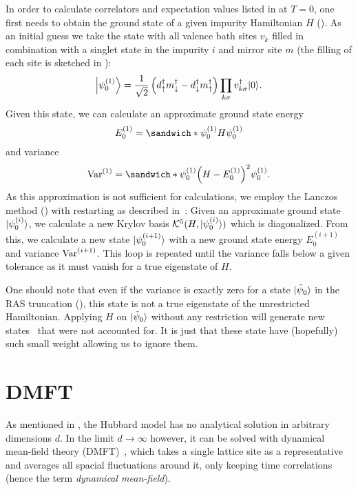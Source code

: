 In order to calculate correlators and expectation values listed in
 at $T=0$,
one first needs to obtain the ground state of a given impurity Hamiltonian $H$
().
As an initial guess we take the state with all valence bath sites $v_k$ filled in combination with
a singlet state in the impurity $i$ and mirror site $m$
(the filling of each site is sketched in ):
\begin{equation}
    \ket*{\psi_0^{(1)}}
    =
    \frac{1}{\sqrt{2}}
    \left(d^\dag_\uparrow m^\dag_\downarrow - d^\dag_\downarrow m^\dag_\uparrow\right)
    \prod_{k\sigma} v^\dag_{k\sigma}
    \ket{0}.
\end{equation}
Given this state, we can calculate an approximate ground state energy
\begin{equation}
    E_0^{(1)} = \sandwich*{\psi_0^{(1)}}{H}{\psi_0^{(1)}}
\end{equation}
and variance
\begin{equation}
    \var^{(1)}
    =
    \sandwich*{\psi_0^{(1)}}{\left(H - E_0^{(1)}\right)^2}{\psi_0^{(1)}}.
\end{equation}
As this approximation is not sufficient for calculations,
we employ the Lanczos method () with restarting
as described in~\cite{Lu2014}:
Given an approximate ground state $\ket{\psi_0^{(i)}}$,
we calculate a new Krylov basis $\mathcal{K}^5(H, \ket{\psi_0^{(i)}})$ which is diagonalized.
From this, we calculate a new state $\ket{\psi_0^{(i+1)}}$
with a new ground state energy $E_0^{(i+1)}$
and variance $\var^{(i+1)}$.
This loop is repeated until the variance falls below a given tolerance
as it must vanish for a true eigenstate of $H$.

One should note that even if the variance is exactly zero for a state $\ket{\tilde\psi_0}$
in the RAS truncation (),
this state is not a true eigenstate of the unrestricted Hamiltonian.
Applying $H$ on $\ket{\tilde\psi_0}$ without any restriction
will generate new states~\cite{Lu2014} that were not accounted for.
It is just that these state have (hopefully) such small weight allowing us to ignore them.

\section{DMFT}%
\label{sec:dmft}

As mentioned in ,
the Hubbard model has no analytical solution in arbitrary dimensions $d$.
In the limit $d\to\infty$ however, it can be solved with
dynamical mean-field theory (DMFT)~\cite{Georges1996},
which takes a single lattice site as a representative
and averages all spacial fluctuations around it, only keeping time correlations
(hence the term \emph{dynamical mean-field}).

